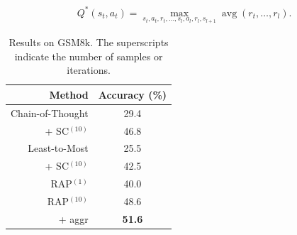 \vspace{-5pt}
{
\small
\begin{align}
    Q^\ast (s_t, a_t) = \max_{s_t, a_t, r_t, \dots, s_l, a_l, r_l, s_{l+1}} \operatorname{avg}(r_t, \dots, r_l). 
    \label{eq:q-avg}
\end{align}
}

\begin{table}[t]
    \centering
    \small
    \begin{tabular}{r | c}
        \toprule
        \textbf{Method} & \textbf{Accuracy (\%)} \\
        \midrule
        Chain-of-Thought & 29.4 \\
        + SC$^{(10)}$ & 46.8 \\
        Least-to-Most & 25.5 \\
        + SC$^{(10)}$ & 42.5 \\
        \midrule
        RAP$^{(1)}$ & 40.0 \\
        RAP$^{(10)}$ & 48.6 \\
        + aggr & \textbf{51.6} \\
        \bottomrule
    \end{tabular}
    \vspace{-5pt}
    \caption{Results on GSM8k. The superscripts indicate the number of samples or iterations.}
    \vspace{-8pt}
    \label{tab:gsm8k}
\end{table}



